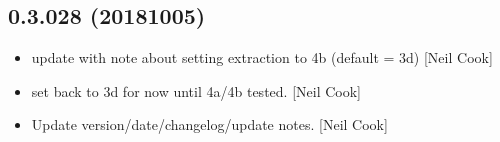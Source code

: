 \documentclass[a4paper,10pt,english]{report}
\begin{document}
\subsection{0.3.028 (2018\sphinxhyphen{}10\sphinxhyphen{}05)}
\label{\detokenize{misc/changelog:id322}}\begin{itemize}
\item {} 
 \sphinxhyphen{} update with note about setting extraction to 4b
(default = 3d) {[}Neil Cook{]}

\item {} 
 \sphinxhyphen{} set  back to 3d for now \sphinxhyphen{}
until 4a/4b tested. {[}Neil Cook{]}

\item {} 
Update \sphinxhyphen{} version/date/changelog/update notes. {[}Neil Cook{]}

\end{itemize}
\end{document}
